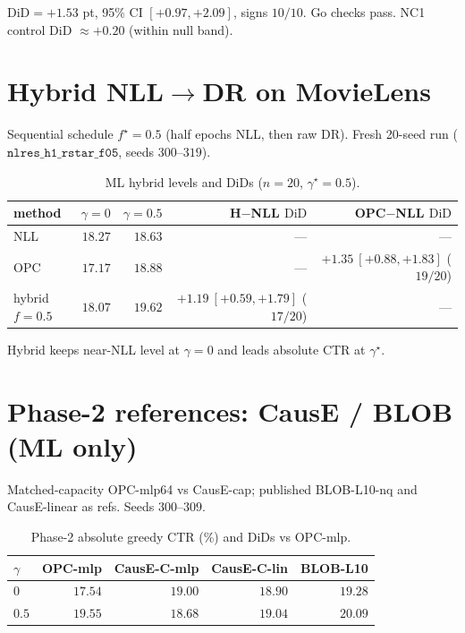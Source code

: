 \documentclass[11pt,a4paper]{article}
\newcommand{\gstar}{\gamma^{\star}}
\newcommand{\DiD}{\mathrm{DiD}}
\begin{document}
\noindent
\(\DiD{=}+1.53\) pt, 95\% CI \([+0.97,+2.09]\), signs \(10/10\).
Go checks pass. NC1 control DiD \(\approx +0.20\) (within null band).

\section{Hybrid NLL\(\to\)DR on MovieLens}
Sequential schedule \(f^{\star}{=}0.5\) (half epochs NLL, then raw DR).
Fresh 20-seed run (\(\texttt{nlres\_h1\_rstar\_f05}\), seeds \(300\)--\(319\)).

\begin{table}[h]
\centering
\caption{ML hybrid levels and DiDs (\(n{=}20\), \(\gstar{=}0.5\)).}
\begin{tabular}{lrrrr}
\toprule
method & \(\gamma{=}0\) & \(\gamma{=}0.5\) & H$-$NLL \(\DiD\) & OPC$-$NLL \(\DiD\) \\
\midrule
NLL & \(18.27\) & \(18.63\) & --- & --- \\
OPC & \(17.17\) & \(18.88\) & --- & \(+1.35\ [+0.88,+1.83]\) (\(19/20\)) \\
hybrid \(f{=}0.5\) & \(18.07\) & \(\mathbf{19.62}\) &
\(+\mathbf{1.19}\ [+0.59,+1.79]\) (\(17/20\)) & --- \\
\bottomrule
\end{tabular}
\end{table}

\noindent
Hybrid keeps near-NLL level at \(\gamma{=}0\) and leads absolute CTR at \(\gstar\).

\section{Phase-2 references: CausE / BLOB (ML only)}
Matched-capacity OPC-mlp64 vs CausE-cap; published BLOB-L10-nq and CausE-linear as refs.
Seeds \(300\)--\(309\).

\begin{table}[h]
\centering
\caption{Phase-2 absolute greedy CTR (\%) and DiDs vs OPC-mlp.}
\begin{tabular}{lrrrr}
\toprule
\(\gamma\) & OPC-mlp & CausE-C-mlp & CausE-C-lin & BLOB-L10 \\
\midrule
\(0\)   & \(17.54\) & \(19.00\) & \(18.90\) & \(19.28\) \\
\(0.5\) & \(19.55\) & \(18.68\) & \(19.04\) & \(\mathbf{20.09}\) \\
\bottomrule
\end{tabular}
\end{table}
\end{document}
